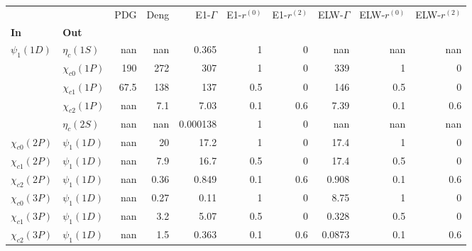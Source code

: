 \begin{tabular}{l|l|r|r|r|r|r|r|r|r}
\toprule
                &                &  PDG &  Deng &  E1-$\Gamma$ &  E1-$r^{(0)}$ &  E1-$r^{(2)}$ &  ELW-$\Gamma$ &  ELW-$r^{(0)}$ &  ELW-$r^{(2)}$ \\
\textbf{In} & \textbf{Out} &      &       &              &               &               &               &                &                \\
\midrule
\textbf{$\psi_{1}(1D)$} & \textbf{$\eta_{c}(1S)$} &  nan &   nan &        0.365 &             1 &             0 &           nan &            nan &            nan \\
                & \textbf{$\chi_{c0}(1P)$} &  190 &   272 &          307 &             1 &             0 &           339 &              1 &              0 \\
                & \textbf{$\chi_{c1}(1P)$} & 67.5 &   138 &          137 &           0.5 &             0 &           146 &            0.5 &              0 \\
                & \textbf{$\chi_{c2}(1P)$} &  nan &   7.1 &         7.03 &           0.1 &           0.6 &          7.39 &            0.1 &            0.6 \\
                & \textbf{$\eta_{c}(2S)$} &  nan &   nan &     0.000138 &             1 &             0 &           nan &            nan &            nan \\
\textbf{$\chi_{c0}(2P)$} & \textbf{$\psi_{1}(1D)$} &  nan &    20 &         17.2 &             1 &             0 &          17.4 &              1 &              0 \\
\textbf{$\chi_{c1}(2P)$} & \textbf{$\psi_{1}(1D)$} &  nan &   7.9 &         16.7 &           0.5 &             0 &          17.4 &            0.5 &              0 \\
\textbf{$\chi_{c2}(2P)$} & \textbf{$\psi_{1}(1D)$} &  nan &  0.36 &        0.849 &           0.1 &           0.6 &         0.908 &            0.1 &            0.6 \\
\textbf{$\chi_{c0}(3P)$} & \textbf{$\psi_{1}(1D)$} &  nan &  0.27 &         0.11 &             1 &             0 &          8.75 &              1 &              0 \\
\textbf{$\chi_{c1}(3P)$} & \textbf{$\psi_{1}(1D)$} &  nan &   3.2 &         5.07 &           0.5 &             0 &         0.328 &            0.5 &              0 \\
\textbf{$\chi_{c2}(3P)$} & \textbf{$\psi_{1}(1D)$} &  nan &   1.5 &        0.363 &           0.1 &           0.6 &        0.0873 &            0.1 &            0.6 \\
\bottomrule
\end{tabular}
